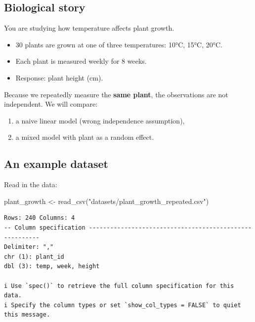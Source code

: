 \documentclass[
  letterpaper,
  8pt,
  a4paper]{book}
\newenvironment{Shaded}{\begin{snugshade}}{\end{snugshade}}
\newcommand{\FunctionTok}[1]{\textcolor[rgb]{0.28,0.35,0.67}{#1}}
\newcommand{\NormalTok}[1]{\textcolor[rgb]{0.00,0.23,0.31}{#1}}
\newcommand{\OtherTok}[1]{\textcolor[rgb]{0.00,0.23,0.31}{#1}}
\newcommand{\StringTok}[1]{\textcolor[rgb]{0.13,0.47,0.30}{#1}}
\providecommand{\tightlist}{%
  \setlength{\itemsep}{0pt}\setlength{\parskip}{0pt}}
\begin{document}

\subsection*{Biological story}\label{biological-story}

You are studying how temperature affects plant growth.

\begin{itemize}
\tightlist
\item
  30 plants are grown at one of three temperatures: 10°C, 15°C, 20°C.
\item
  Each plant is measured weekly for 8 weeks.
\item
  Response: plant height (cm).
\end{itemize}

Because we repeatedly measure the \textbf{same plant}, the observations
are not independent. We will compare:

\begin{enumerate}
\def\labelenumi{\arabic{enumi}.}
\tightlist
\item
  a naive linear model (wrong independence assumption),
\item
  a mixed model with plant as a random effect.
\end{enumerate}

\subsection*{An example dataset}\label{an-example-dataset-1}

Read in the data:

\begin{Shaded}
\begin{Highlighting}[]
\NormalTok{plant\_growth }\OtherTok{\textless{}{-}} \FunctionTok{read\_csv}\NormalTok{(}\StringTok{"datasets/plant\_growth\_repeated.csv"}\NormalTok{)}
\end{Highlighting}
\end{Shaded}

\begin{verbatim}
Rows: 240 Columns: 4
-- Column specification --------------------------------------------------------
Delimiter: ","
chr (1): plant_id
dbl (3): temp, week, height

i Use `spec()` to retrieve the full column specification for this data.
i Specify the column types or set `show_col_types = FALSE` to quiet this message.
\end{verbatim}
\end{document}
